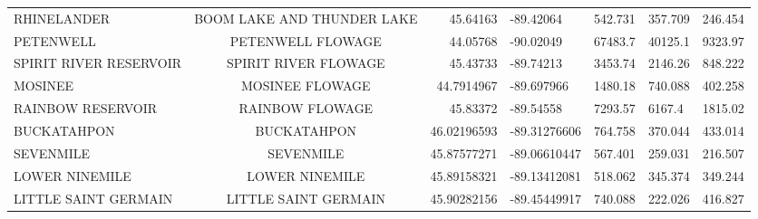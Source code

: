 \begin{table}[h!]
\begin{tabular}{ l c r }
		RHINELANDER & BOOM LAKE AND THUNDER LAKE & 45.64163 & -89.42064 & 542.731 & 357.709 & 246.454 \\
		PETENWELL & PETENWELL FLOWAGE & 44.05768 & -90.02049 & 67483.7 & 40125.1 & 9323.97 \\
		SPIRIT RIVER RESERVOIR & SPIRIT RIVER FLOWAGE & 45.43733 & -89.74213 & 3453.74 & 2146.26 & 848.222 \\
		MOSINEE & MOSINEE FLOWAGE & 44.7914967 & -89.697966 & 1480.18 & 740.088 & 402.258 \\
		RAINBOW RESERVOIR & RAINBOW FLOWAGE & 45.83372 & -89.54558 & 7293.57 & 6167.4 & 1815.02 \\
		BUCKATAHPON & BUCKATAHPON & 46.02196593 & -89.31276606 & 764.758 & 370.044 & 433.014 \\
		SEVENMILE & SEVENMILE & 45.87577271 & -89.06610447 & 567.401 & 259.031 & 216.507 \\
		LOWER NINEMILE & LOWER NINEMILE & 45.89158321 & -89.13412081 & 518.062 & 345.374 & 349.244 \\
		LITTLE SAINT GERMAIN & LITTLE SAINT GERMAIN & 45.90282156 & -89.45449917 & 740.088 & 222.026 & 416.827 \\

		\hline
	\end{tabular}
	\label{table:res_table}
\end{table}	



